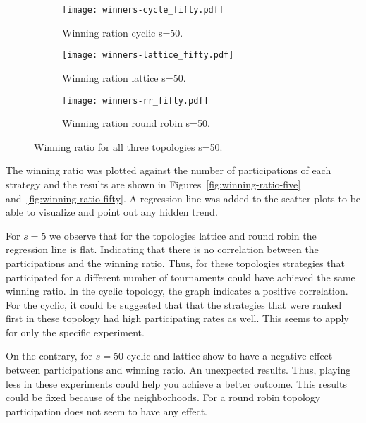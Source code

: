 \begin{figure}[H]
\centering
    \begin{subfigure}[t]{1\textwidth}
    \centering
        \texttt{[image: winners-cycle\_fifty.pdf]}
    \caption{Winning ration cyclic s=50.}
    \end{subfigure}
\hfill
    \begin{subfigure}[t]{1\textwidth}\centering
    \centering
        \texttt{[image: winners-lattice\_fifty.pdf]}
    \caption{Winning ration lattice s=50.}
    \end{subfigure}
\hfill
    \begin{subfigure}[t]{1\textwidth}\centering
    \centering
        \texttt{[image: winners-rr\_fifty.pdf]}
    \caption{Winning ration round robin s=50.}
    \end{subfigure}
\caption{Winning ratio for all three topologies s=50.}
\label{fig:winning-fifty}
\end{figure}


The winning ratio was plotted against the number of participations of each
strategy and the results are shown in Figures~\ref{fig:winning-ratio-five}
and~\ref{fig:winning-ratio-fifty}. A regression line was added to the scatter plots
to be able to visualize and point out any hidden trend.

For \(s=5\) we observe that for the topologies lattice and round robin
the regression line is flat. Indicating that there is no correlation between the
participations and the winning ratio. Thus, for these topologies strategies
that participated for a different number of tournaments could have achieved the
same winning ratio. In the cyclic topology, the graph indicates a positive
correlation. For the cyclic,
it could be suggested that that the strategies that were ranked first in these
topology had high
participating rates as well. This seems to apply for only the specific experiment.

On the contrary, for \(s=50\) cyclic and lattice show to have a negative
effect between participations and winning ratio. An unexpected results. Thus, playing
less in these experiments could help you achieve a better outcome. This results
could be fixed because of the neighborhoods. For a round robin topology
participation does not seem to have any effect.

